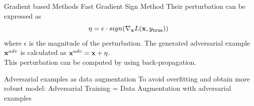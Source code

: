 \documentclass[xcolor=pdftex,dvipsnames,table,mathserif]{beamer}
\begin{document}



\begin{frame}{Gradient based Methods}
Fast Gradient Sign Method \cite{Adversarial}
Their perturbation can be expressed as
\begin{equation}
\eta =\epsilon \cdot sign(\nabla_{\mathbf{x}} L (\mathbf{x},y_{\texttt{true}}))
\end{equation}
where $\epsilon$ is the magnitude of the perturbation.
The generated adversarial example $\mathbf{x}^{adv}$ is calculated as $\mathbf{x}^{adv}=\mathbf{x}+\eta$.\\
This perturbation can be computed by using back-propagation.


\pause

\begin{alertblock}{Adversarial examples as data augmentation}
To avoid overfitting and obtain more robust model: Adversarial Training = Data Augmentation with adversarial examples
\end{alertblock}

\end{frame}
\end{document}
